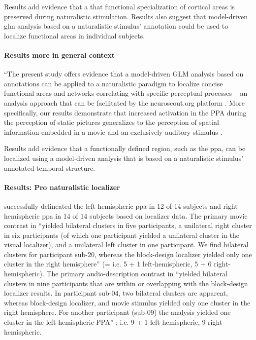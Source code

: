 Results add evidence \citep[cf.][]{bartels2004mapping} that a that functional
specialization of cortical areas is preserved during naturalistic stimulation.
%
Results also suggest that model-driven \ac{glm} analysis based on a naturalistic
stimulus' annotation could be used to localize functional areas in individual
subjects.


\paragraph{Results more in general context}

``The present study offers evidence that a model-driven GLM analysis based on
annotations can be applied to a naturalistic paradigm to localize concise
functional areas and networks correlating with specific perceptual processes --
an analysis approach that can be facilitated by the neuroscout.org platform
\citep{delavega2021neuroscout}.
More specifically, our results demonstrate that increased activation in the PPA
during the perception of static pictures generalizes to the perception of
spatial information embedded in a movie and an exclusively auditory stimulus
\citep{haeusler2022processing}.

Results add evidence \citep[cf.][]{bartels2004mapping} that a functionally
defined region, such as the \ac{ppa}, can be localized using a model-driven
analysis that is based on a naturalistic stimulus' annotated temporal structure.


\paragraph{Results: Pro naturalistic localizer}


\citet{sengupta2016extension} successfully delineated the left-hemispheric
\ac{ppa} in 12 of 14 subjects and right-hemispheric \ac{ppa} in 14 of 14
subjects based on localizer data.
%
The primary movie contrast in \citet{haeusler2022processing} ``yielded bilateral
clusters in five participants, a unilateral right cluster in six participants
(of which one participant yielded a unilateral cluster in the visual localizer),
and a unilateral left cluster in one participant.
%
We find bilateral clusters for participant sub-20, whereas the block-design
localizer yielded only one cluster in the right hemisphere''
\citep{haeusler2022processing} (= i.e. 5 + 1 left-hemispheric, 5 + 6
right-hemispheric).
%
The primary audio-description contrast in \citet{haeusler2022processing}
``yielded bilateral clusters in nine participants that are within or overlapping
with the block-design localizer results.
%
In participant sub-04, two bilateral clusters are apparent, whereas block-design
localizer, and movie stimulus yielded only one cluster in the right hemisphere.
%
For another participant (sub-09) the analysis yielded one cluster in the
left-hemispheric PPA'' \citep{haeusler2022processing}; i.e. 9 + 1
left-hemispheric, 9 right-hemispheric.


